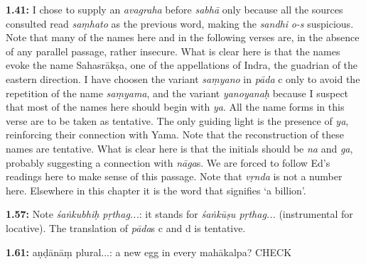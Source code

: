 \documentclass{article}
\newcommand{\vsnum}[1]{\textbf{#1}}
\newcommand{\skt}[1]{\textit{#1}}
\newcommand{\Ed}{Ed}
\begin{document}
\vsnum{1.41: }I chose to supply an \skt{avagraha} before \skt{sabhā} only because all the sources consulted read \skt{saṃhato} as the previous word, making the \skt{sandhi} \skt{o-s} suspicious. Note that many of the names here and in the following verses are, in the absence of any parallel passage, rather insecure. What is clear here is that the names evoke the name Sahasrākṣa, one of the appellations of Indra, the guadrian of the eastern direction. I have choosen the variant \skt{saṃyano} in \skt{pāda} c only to avoid the repetition of the name \skt{saṃyama}, and the variant \skt{yanoyanaḥ} because I suspect that most of the names here should begin with \skt{ya}. All the name forms in this verse are to be taken as tentative. The only guiding light is the presence of \skt{ya}, reinforcing their connection with Yama. Note that the reconstruction of these names are tentative. What is clear here is that the initials should be \skt{na} and \skt{ga}, probably suggesting a connection with \skt{nāga}s. We are forced to follow \Ed's readings here to make sense of this passage. Note that \skt{vṛnda} is not a number here. Elsewhere in this chapter it is the word that signifies `a billion'.

\vsnum{1.57: }Note \skt{śaṅkubhiḥ pṛthag...}: it stands for \skt{śaṅkūṣu pṛthag...} (instrumental for locative). The translation of \skt{pāda}s c and d is tentative.

\vsnum{1.61: }aṇḍānāṃ plural...: a new egg in every mahākalpa? CHECK
\end{document}
